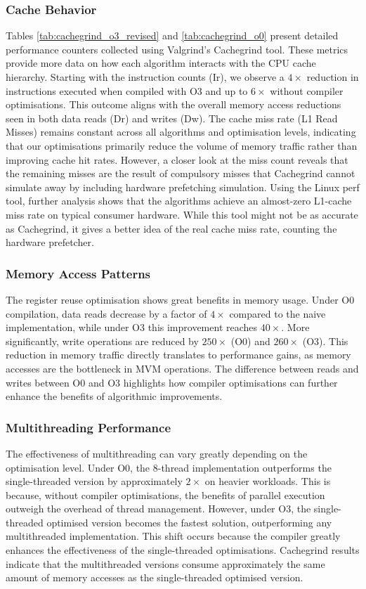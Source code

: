 \subsubsection{Cache Behavior}\label{sec:cache_beh}
Tables \ref{tab:cachegrind_o3_revised} and \ref{tab:cachegrind_o0} present detailed performance counters collected using Valgrind's Cachegrind tool.
These metrics provide more data on how each algorithm interacts with the CPU cache hierarchy.
Starting with the instruction counts (Ir), we observe a $4\times$ reduction in instructions executed when compiled with O3 and up to $6\times$ without compiler optimisations. This outcome aligns with the overall memory access reductions seen in both data reads (Dr) and writes (Dw).
The cache miss rate (L1 Read Misses) remains constant across all algorithms and optimisation levels, indicating that our optimisations primarily reduce the volume of memory traffic rather than improving cache hit rates.
However, a closer look at the miss count reveals that the remaining misses are the result of compulsory misses that Cachegrind cannot simulate away by including hardware prefetching simulation.
Using the Linux perf tool, further analysis shows that the algorithms achieve an almost-zero L1-cache miss rate on typical consumer hardware.
While this tool might not be as accurate as Cachegrind, it gives a better idea of the real cache miss rate, counting the hardware prefetcher.

\subsubsection{Memory Access Patterns}\label{sec:mem_access}
The register reuse optimisation shows great benefits in memory usage.
Under O0 compilation, data reads decrease by a factor of $4\times$ compared to the naive implementation, while under O3 this improvement reaches $40\times$.
More significantly, write operations are reduced by $250\times$ (O0) and $260\times$ (O3).
This reduction in memory traffic directly translates to performance gains, as memory accesses are the bottleneck in MVM operations.
The difference between reads and writes between O0 and O3 highlights how compiler optimisations can further enhance the benefits of algorithmic improvements.

\subsubsection{Multithreading Performance}\label{sec:multi_perf}
The effectiveness of multithreading can vary greatly depending on the optimisation level.
Under O0, the 8-thread implementation outperforms the single-threaded version by approximately $2\times$ on heavier workloads.
This is because, without compiler optimisations, the benefits of parallel execution outweigh the overhead of thread management.
However, under O3, the single-threaded optimised version becomes the fastest solution, outperforming any multithreaded implementation.
This shift occurs because the compiler greatly enhances the effectiveness of the single-threaded optimisations.
Cachegrind results indicate that the multithreaded versions consume approximately the same amount of memory accesses as the single-threaded optimised version.

